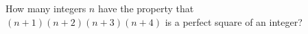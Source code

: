 How many integers $n$ have the property that $(n+1)(n+2)(n+3)(n+4)$ is a perfect square of an integer?
